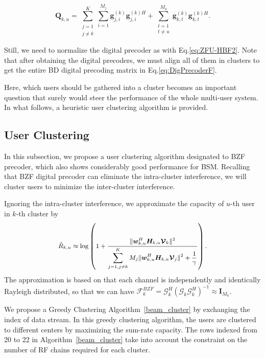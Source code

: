 \documentclass[conference]{IEEEtran}
\begin{document}
{\begin{equation}
\bm{Q}_{k,u}=\displaystyle\sum_{\substack{j=1\\j\neq k}}^{K}\displaystyle\sum_{i=1}^{M_j}\bm{g}_{j,i}^{(k)}\bm{g}_{j,i}^{(k)H} + \displaystyle\sum_{\substack{t=1\\t\neq u}}^{M_k}\bm{g}_{k,t}^{(k)} \bm{g}_{k,t}^{(k)H}.
\end{equation}

Still, we need to normalize the digital precoder as with Eq.\eqref{eq:ZFU-HBF2}. Note that after obtaining the digital precoders, we must align all of them in clusters to get the entire BD digital precoding matrix in Eq.\eqref{eq:DigPrecoderF}.

Here, which users should be gathered into a cluster becomes an important question that surely would steer the performance of the whole multi-user system. In what follows, a heuristic user clustering algorithm is provided.
\subsection{User Clustering}
In this subsection, we propose a user clustering algorithm designated to BZF precoder, which also shows considerably good performance for BSM. Recalling that BZF digital precoder can eliminate the intra-cluster interference, we will cluster users to minimize the inter-cluster interference. 

Ignoring the intra-cluster interference, we approximate the capacity of $u$-th user in $k$-th cluster by
\begin{align}\label{capacity}\small
\tilde{R}_{k,u} \approx \log\left(1+\frac{\|\bm{w}^H_{k,u} \bm{H}_{k,u} \bm{\mathcal{V}}_{k}\|^2}{\displaystyle\sum_{j=1,j\neq k}^{K}M_j\|{\bm{w}}^H_{k,u} \bm{H}_{k,u} {\bm{\mathcal{V}}}_j\|^2+{1\over \gamma}}\right).
\end{align}
The approximation is based on that each channel is independently and identically Rayleigh distributed, so that we can have $\bm{\mathcal{F}}^{BZF}_{k} = \bm{\mathcal{G}}_k^H (\bm{\mathcal{G}}_k \bm{\mathcal{G}}_k^H)^{-1}\approx \mathbf{I}_{M_k}$.

We propose a Greedy Clustering Algorithm~\ref{beam_cluster} by exchanging the index of data stream. In this greedy clustering algorithm,  the users are clustered to different centers by maximizing the sum-rate capacity. The rows indexed from 20 to 22 in Algorithm~\ref{beam_cluster} take into account the constraint on the number of RF chains required for each cluster.

}
\end{document}
